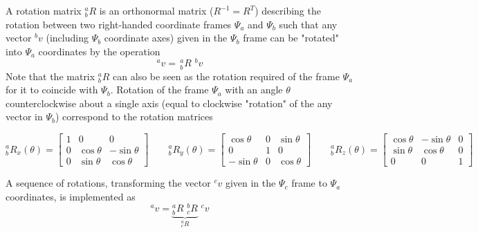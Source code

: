 A rotation matrix $^a_bR$ is an orthonormal matrix ($R^{-1}=R^T$) describing the rotation between two right-handed coordinate frames $\Psi_a$ and $\Psi_b$ such that any vector $^bv$ (including $\Psi_b$ coordinate axes) given in the $\Psi_b$ frame can be "rotated" into $\Psi_a$ coordinates by the operation
\begin{equation}
^av =\, ^a_bR \,\,^bv
\end{equation}
Note that the matrix $^a_bR$ can also be seen as the rotation required of the frame $\Psi_a$ for it to coincide with $\Psi_b$.
Rotation of the frame $\Psi_a$ with an angle $\theta$ counterclockwise about a single axis (equal to clockwise "rotation" of the any vector in $\Psi_b$) correspond to the rotation matrices
\begin{small}
\begin{equation}
^a_bR_x(\theta) = 
\begin{bmatrix}
1 & 0 & 0\\
0 & \cos\theta & -\sin\theta\\
0 & \sin\theta & \cos\theta
\end{bmatrix} 
\qquad
^a_bR_y(\theta) = 
\begin{bmatrix}
\cos\theta & 0 & \sin\theta \\
0 & 1 & 0\\
-\sin\theta & 0 & \cos\theta
\end{bmatrix}
\qquad
^a_bR_z(\theta) = 
\begin{bmatrix}
\cos\theta & -\sin\theta & 0\\
\sin\theta & \cos\theta & 0\\
0 & 0 & 1
\end{bmatrix}
\label{eq:RxRyRz}
\end{equation}
\end{small}
A sequence of rotations, transforming the vector $^cv$ given in the $\Psi_c$ frame to $\Psi_a$ coordinates, is implemented as
\begin{equation}
^av = \underbrace{^a_bR \,\, ^b_cR}_{^a_cR} \,\,^cv 
\end{equation}

